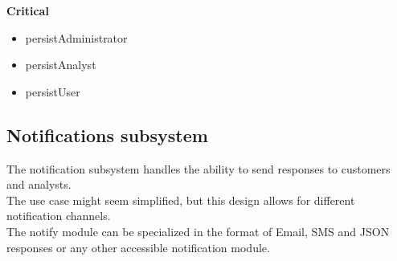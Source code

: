 \documentclass{article}
\begin{document}
		\begin{flushleft}
			\textbf{Critical}
				\begin{itemize}
					\item persistAdministrator
					\item persistAnalyst
					\item persistUser
				\end{itemize}
		\end{flushleft}







	\pagebreak
	\subsection{Notifications subsystem}\label{subsec:Notifcations}
	The notification subsystem handles the ability to send responses to customers and analysts.\\ The use case might seem simplified, but this design allows for different notification channels. \\The notify module can be specialized in the format of Email, SMS and JSON responses or any other accessible notification module.
\end{document}
